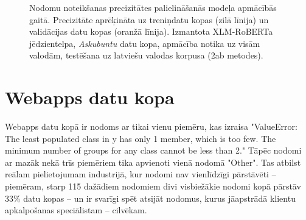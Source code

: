 \begin{figure}[h] 
   \centering
   \caption{Nodomu noteikšanas precizitātes palielināšanās modeļa apmācībās gaitā. Precizitāte aprēķināta uz treniņdatu kopas (zilā līnija) un validācijas datu kopas (oranžā līnija). Izmantota XLM-RoBERTa jēdzientelpa, \textit{Askubuntu} datu kopa, apmācība notika uz visām valodām, testēšana uz latviešu valodas korpusa (2ab metodes).} 
   \label{fig:askubuntu-xlm-all}
\end{figure}



\section{Webapps datu kopa}


Webapps datu kopā ir nodoms ar tikai vienu piemēru, kas izraisa "ValueError: The least populated class in y has only 1 member, which is too few. The minimum number of groups for any class cannot be less than 2." Tāpēc nodomi ar mazāk nekā trīs piemēriem tika apvienoti vienā nodomā "Other". Tas atbilst reālam pielietojumam industrijā, kur nodomi nav vienlīdzīgi pārstāvēti  -- piemēram, starp 115 dažādiem nodomiem divi visbiežākie nodomi kopā pārstāv 33\% datu kopas \cite{paikens2020} -- un ir svarīgi spēt atsijāt nodomus, kurus jāapstrādā klientu apkalpošanas speciālistam -- cilvēkam.

